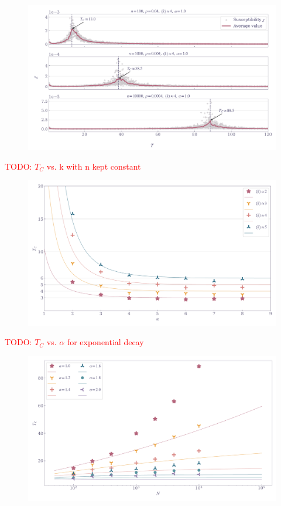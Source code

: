 \documentclass[11pt,a4paper]{article}
\newcommand{\todo}[1]{\textcolor{red}{TODO: #1}}
\begin{document}
\begin{figure}[ht!]
    \includegraphics[width=\linewidth]{../figures/suscept_ER_single.pdf}
\end{figure}

\todo{$T_C$ vs. k with n kept constant}
\begin{figure}[ht!]
    \includegraphics[width=\linewidth]{../figures/TC_vs_alpha.pdf}
\end{figure}

\todo{$T_C$ vs. $\alpha$ for exponential decay}
\begin{figure}[ht!]
    \includegraphics[width=\linewidth]{../figures/TC_vs_size.pdf}
\end{figure}
\end{document}

